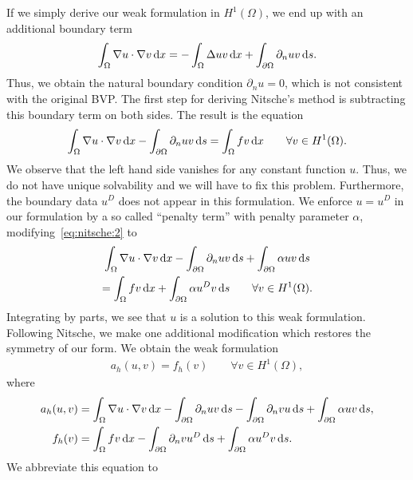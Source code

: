 \begin{intro}
  If we simply derive our weak formulation in $H^1(\Omega)$, we end up
  with an additional boundary term
  \begin{gather}
    \int_\Omega \nabla u \cdot \nabla v \,\mathrm{d} x
    =
    - \int_\Omega \Delta u v \,\mathrm{d} x
    + \int_{\partial\Omega} \partial_n u v \,\mathrm{d} s.
  \end{gather}
  Thus, we obtain the natural boundary condition $\partial_n u=0$,
  which is not consistent with the original BVP. The first step for
  deriving Nitsche's method is subtracting this boundary term on both
  sides. The result is the equation
  \begin{gather}
    \label{eq:nitsche:2}
    \int_\Omega \nabla u \cdot \nabla v \,\mathrm{d} x
    -\int_{\partial\Omega} \partial_n u v \,\mathrm{d} s
    = \int_\Omega fv\,\mathrm{d} x
    \qquad\forall v\in H^1(\Omega).
  \end{gather}
  We observe that the left hand side vanishes for any constant
  function $u$. Thus, we do not have unique solvability and we will
  have to fix this problem. Furthermore, the boundary data $u^D$ does
  not appear in this formulation. We enforce $u=u^D$ in our
  formulation by a so called ``penalty term'' with penalty parameter
  $\alpha$, modifying~\eqref{eq:nitsche:2} to
  \begin{multline}
    \label{eq:nitsche:3}
    \int_\Omega \nabla u \cdot \nabla v \,\mathrm{d} x
    -\int_{\partial\Omega} \partial_n u v \,\mathrm{d} s
    + \int_{\partial\Omega} \alpha u v \,\mathrm{d} s
    \\
    = \int_\Omega fv\,\mathrm{d} x
    + \int_{\partial\Omega} \alpha u^D v \,\mathrm{d} s
    \qquad\forall v\in H^1(\Omega).
  \end{multline}
  Integrating by parts, we see that $u$ is a solution to this weak
  formulation. Following Nitsche, we make one additional modification
  which restores the symmetry of our form. We obtain the weak
  formulation
  \begin{gather}
    \label{eq:nitsche:5}
    a_h(u,v) = f_h(v) \qquad\forall v\in H^1(\Omega),
  \end{gather}
  where
  \begin{gather}
    \label{eq:nitsche:4}
    \begin{split}
    a_h(u,v) &= \int_\Omega \nabla u \cdot \nabla v \,\mathrm{d} x
    -\int_{\partial\Omega} \partial_n u v \,\mathrm{d} s
    -\int_{\partial\Omega} \partial_n v u \,\mathrm{d} s
    + \int_{\partial\Omega} \alpha u v \,\mathrm{d} s,
    \\
    f_h(v) &= \int_\Omega fv\,\mathrm{d} x
    -\int_{\partial\Omega} \partial_n v u^D \,\mathrm{d} s
    + \int_{\partial\Omega} \alpha u^D v \,\mathrm{d} s.
  \end{split}
\end{gather}
  We abbreviate this equation to
\end{intro}

